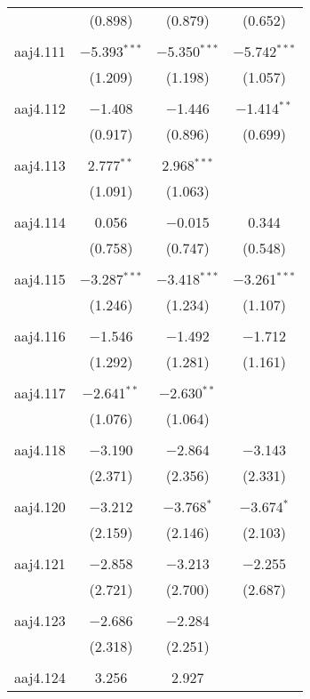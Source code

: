 \begin{table}[!htbp]
\begin{tabular}{@{\extracolsep{5pt}}lccc}
  & (0.898) & (0.879) & (0.652) \\ 
  & & & \\ 
 aaj4.111 & $-$5.393$^{***}$ & $-$5.350$^{***}$ & $-$5.742$^{***}$ \\ 
  & (1.209) & (1.198) & (1.057) \\ 
  & & & \\ 
 aaj4.112 & $-$1.408 & $-$1.446 & $-$1.414$^{**}$ \\ 
  & (0.917) & (0.896) & (0.699) \\ 
  & & & \\ 
 aaj4.113 & 2.777$^{**}$ & 2.968$^{***}$ &  \\ 
  & (1.091) & (1.063) &  \\ 
  & & & \\ 
 aaj4.114 & 0.056 & $-$0.015 & 0.344 \\ 
  & (0.758) & (0.747) & (0.548) \\ 
  & & & \\ 
 aaj4.115 & $-$3.287$^{***}$ & $-$3.418$^{***}$ & $-$3.261$^{***}$ \\ 
  & (1.246) & (1.234) & (1.107) \\ 
  & & & \\ 
 aaj4.116 & $-$1.546 & $-$1.492 & $-$1.712 \\ 
  & (1.292) & (1.281) & (1.161) \\ 
  & & & \\ 
 aaj4.117 & $-$2.641$^{**}$ & $-$2.630$^{**}$ &  \\ 
  & (1.076) & (1.064) &  \\ 
  & & & \\ 
 aaj4.118 & $-$3.190 & $-$2.864 & $-$3.143 \\ 
  & (2.371) & (2.356) & (2.331) \\ 
  & & & \\ 
 aaj4.120 & $-$3.212 & $-$3.768$^{*}$ & $-$3.674$^{*}$ \\ 
  & (2.159) & (2.146) & (2.103) \\ 
  & & & \\ 
 aaj4.121 & $-$2.858 & $-$3.213 & $-$2.255 \\ 
  & (2.721) & (2.700) & (2.687) \\ 
  & & & \\ 
 aaj4.123 & $-$2.686 & $-$2.284 &  \\ 
  & (2.318) & (2.251) &  \\ 
  & & & \\ 
 aaj4.124 & 3.256 & 2.927 &  \\ 

\end{tabular}
\end{table}
